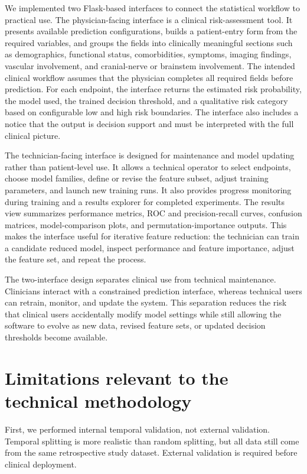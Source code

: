 \documentclass[11pt,a4paper]{article}
\begin{document}
We implemented two Flask-based interfaces to connect the statistical workflow to practical use. The physician-facing interface is a clinical risk-assessment tool. It presents available prediction configurations, builds a patient-entry form from the required variables, and groups the fields into clinically meaningful sections such as demographics, functional status, comorbidities, symptoms, imaging findings, vascular involvement, and cranial-nerve or brainstem involvement. The intended clinical workflow assumes that the physician completes all required fields before prediction. For each endpoint, the interface returns the estimated risk probability, the model used, the trained decision threshold, and a qualitative risk category based on configurable low and high risk boundaries. The interface also includes a notice that the output is decision support and must be interpreted with the full clinical picture.

The technician-facing interface is designed for maintenance and model updating rather than patient-level use. It allows a technical operator to select endpoints, choose model families, define or revise the feature subset, adjust training parameters, and launch new training runs. It also provides progress monitoring during training and a results explorer for completed experiments. The results view summarizes performance metrics, ROC and precision-recall curves, confusion matrices, model-comparison plots, and permutation-importance outputs. This makes the interface useful for iterative feature reduction: the technician can train a candidate reduced model, inspect performance and feature importance, adjust the feature set, and repeat the process.

The two-interface design separates clinical use from technical maintenance. Clinicians interact with a constrained prediction interface, whereas technical users can retrain, monitor, and update the system. This separation reduces the risk that clinical users accidentally modify model settings while still allowing the software to evolve as new data, revised feature sets, or updated decision thresholds become available.

\section{Limitations relevant to the technical methodology}

First, we performed internal temporal validation, not external validation. Temporal splitting is more realistic than random splitting, but all data still come from the same retrospective study dataset. External validation is required before clinical deployment.
\end{document}
